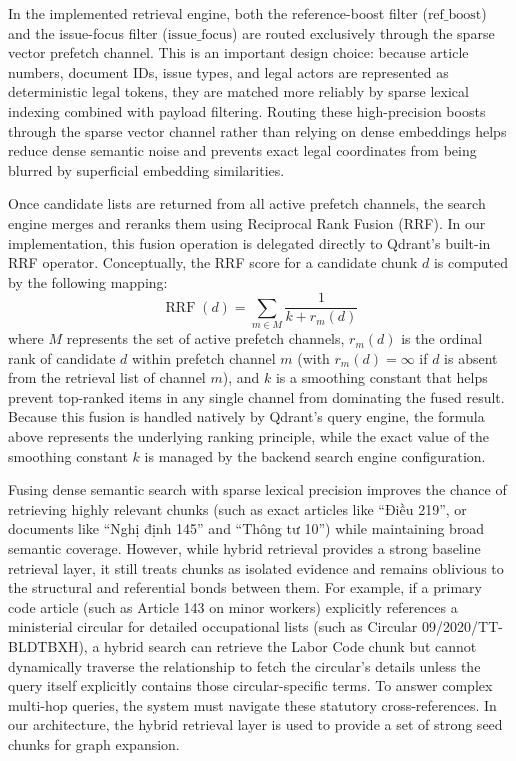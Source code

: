 In the implemented retrieval engine, both the reference-boost filter ($\text{ref\_boost}$) and the issue-focus filter ($\text{issue\_focus}$) are routed exclusively through the sparse vector prefetch channel. This is an important design choice: because article numbers, document IDs, issue types, and legal actors are represented as deterministic legal tokens, they are matched more reliably by sparse lexical indexing combined with payload filtering. Routing these high-precision boosts through the sparse vector channel rather than relying on dense embeddings helps reduce dense semantic noise and prevents exact legal coordinates from being blurred by superficial embedding similarities.

Once candidate lists are returned from all active prefetch channels, the search engine merges and reranks them using Reciprocal Rank Fusion (RRF). In our implementation, this fusion operation is delegated directly to Qdrant's built-in RRF operator. Conceptually, the RRF score for a candidate chunk $d$ is computed by the following mapping:
\[
\operatorname{RRF}(d)=
\sum_{m \in M}
\frac{1}{k + r_m(d)}
\]
where $M$ represents the set of active prefetch channels, $r_m(d)$ is the ordinal rank of candidate $d$ within prefetch channel $m$ (with $r_m(d) = \infty$ if $d$ is absent from the retrieval list of channel $m$), and $k$ is a smoothing constant that helps prevent top-ranked items in any single channel from dominating the fused result. Because this fusion is handled natively by Qdrant's query engine, the formula above represents the underlying ranking principle, while the exact value of the smoothing constant $k$ is managed by the backend search engine configuration.

Fusing dense semantic search with sparse lexical precision improves the chance of retrieving highly relevant chunks (such as exact articles like ``Điều 219'', or documents like ``Nghị định 145'' and ``Thông tư 10'') while maintaining broad semantic coverage. However, while hybrid retrieval provides a strong baseline retrieval layer, it still treats chunks as isolated evidence and remains oblivious to the structural and referential bonds between them. For example, if a primary code article (such as Article 143 on minor workers) explicitly references a ministerial circular for detailed occupational lists (such as Circular 09/2020/TT-BLDTBXH), a hybrid search can retrieve the Labor Code chunk but cannot dynamically traverse the relationship to fetch the circular's details unless the query itself explicitly contains those circular-specific terms. To answer complex multi-hop queries, the system must navigate these statutory cross-references. In our architecture, the hybrid retrieval layer is used to provide a set of strong seed chunks for graph expansion.

